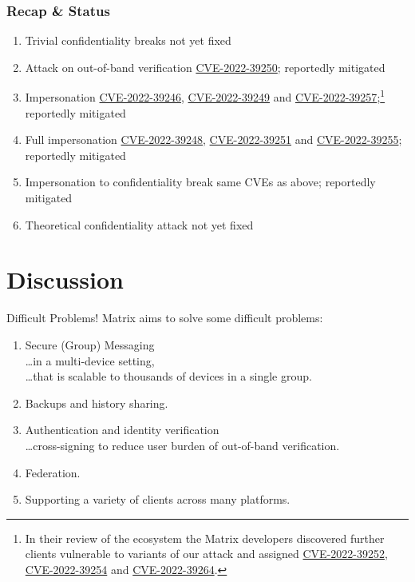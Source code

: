 \documentclass[aspectratio=169]{beamer}
\begin{document}
\begin{frame}
  \frametitle{Recap \& Status}
  \begin{enumerate}
  \item \alert{Trivial confidentiality breaks} not yet fixed
  \item \alert{Attack on out-of-band verification} \href{https://nvd.nist.gov/vuln/detail/CVE-2022-39250}{CVE-2022-39250}; reportedly mitigated
  \item \alert{Impersonation}  \href{https://nvd.nist.gov/vuln/detail/CVE-2022-39246}{CVE-2022-39246},
\href{https://nvd.nist.gov/vuln/detail/CVE-2022-39249}{CVE-2022-39249} and
\href{https://nvd.nist.gov/vuln/detail/CVE-2022-39257}{CVE-2022-39257};\footnote{In their review of the ecosystem the Matrix developers discovered further clients vulnerable to variants of our attack and assigned
\href{https://nvd.nist.gov/vuln/detail/CVE-2022-39252}{CVE-2022-39252},
\href{https://nvd.nist.gov/vuln/detail/CVE-2022-39254}{CVE-2022-39254} and
\href{https://nvd.nist.gov/vuln/detail/CVE-2022-39264}{CVE-2022-39264}.} reportedly mitigated
  \item \alert{Full impersonation} \href{https://nvd.nist.gov/vuln/detail/CVE-2022-39248}{CVE-2022-39248},
\href{https://nvd.nist.gov/vuln/detail/CVE-2022-39251}{CVE-2022-39251} and \href{https://nvd.nist.gov/vuln/detail/CVE-2022-39255}{CVE-2022-39255}; reportedly mitigated
  \item \alert{Impersonation to confidentiality break} same CVEs as above; reportedly mitigated
  \item \alert{Theoretical confidentiality attack} not yet fixed
  \end{enumerate}
\end{frame}

\section{Discussion}

\begin{frame}{Difficult Problems!}
  Matrix aims to solve some difficult problems:
  \begin{enumerate}
    \item Secure (Group) Messaging \\
    \dots in a multi-device setting, \\
    \dots that is scalable to thousands of devices in a single group.
    \item Backups and history sharing.
    \item Authentication and identity verification \\
    \dots cross-signing to reduce user burden of out-of-band verification.
    \item Federation.
    \item Supporting a variety of clients across many platforms.
  \end{enumerate}

\end{frame}
\end{document}
